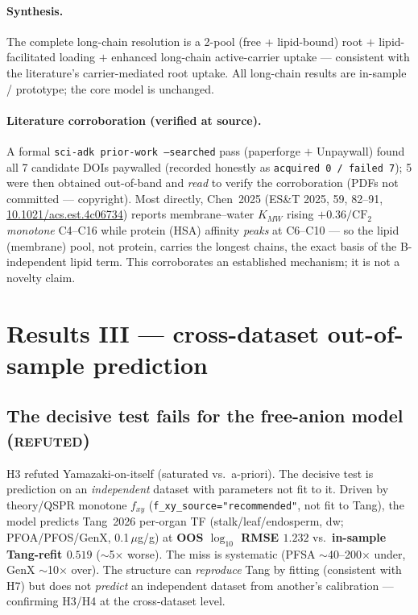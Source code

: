\documentclass[11pt]{article}
\begin{document}
\paragraph{Synthesis.} The complete long-chain resolution is a 2-pool
(free + lipid-bound) root $+$ lipid-facilitated loading $+$ enhanced
long-chain active-carrier uptake --- consistent with the literature's
carrier-mediated root uptake. All long-chain results are in-sample /
prototype; the core model is unchanged.

\paragraph{Literature corroboration (verified at source).} A formal
\texttt{sci-adk prior-work --searched} pass (paperforge $+$ Unpaywall)
found all 7 candidate DOIs paywalled (recorded honestly as
\texttt{acquired 0 / failed 7}); 5 were then obtained out-of-band and
\emph{read} to verify the corroboration (PDFs not committed ---
copyright). Most directly, Chen~2025 (ES\&T 2025, 59, 82--91,
\href{https://doi.org/10.1021/acs.est.4c06734}{10.1021/acs.est.4c06734})
reports membrane--water $K_{MW}$ rising $+0.36/\mathrm{CF_2}$
\emph{monotone} C4--C16 while protein (HSA) affinity \emph{peaks} at
C6--C10 --- so the lipid (membrane) pool, not protein, carries the
longest chains, the exact basis of the B-independent lipid term. This
corroborates an established mechanism; it is not a novelty claim.

\section{Results III --- cross-dataset out-of-sample prediction}
\label{sec:oos}

\subsection{The decisive test fails for the free-anion model
(\textsc{refuted})}

H3 refuted Yamazaki-on-itself (saturated vs.\ a-priori). The decisive
test is prediction on an \emph{independent} dataset with parameters
not fit to it. Driven by theory/QSPR monotone $f_{xy}$
(\texttt{f\_xy\_source="recommended"}, not fit to Tang), the model
predicts Tang~2026 per-organ TF (stalk/leaf/endosperm, dw;
PFOA/PFOS/GenX, 0.1\,$\mu$g/g) at \textbf{OOS $\log_{10}$ RMSE
$1.232$} vs.\ \textbf{in-sample Tang-refit $0.519$} ($\sim$5$\times$
worse). The miss is systematic (PFSA $\sim$40--200$\times$ under, GenX
$\sim$10$\times$ over). The structure can \emph{reproduce} Tang by
fitting (consistent with H7) but does not \emph{predict} an
independent dataset from another's calibration --- confirming H3/H4 at
the cross-dataset level.
\end{document}
